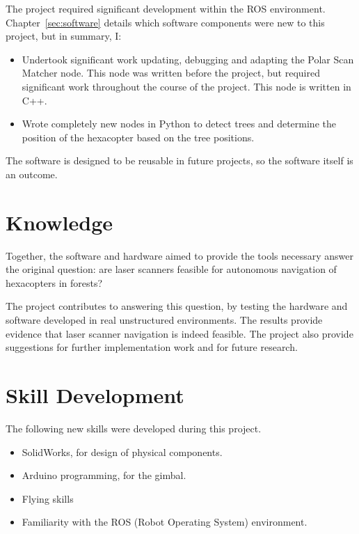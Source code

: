 \documentclass[12pt,oneside,a4paper]{book}
\begin{document}
The project required significant development within the ROS
environment. Chapter~\ref{sec:software} details which software
components were new to this project, but in summary, I:
\begin{itemize}
\item Undertook significant work updating, debugging and adapting the
  Polar Scan Matcher node. This node was written before the project,
  but required significant work throughout the course of the
  project. This node is written in C++.
\item Wrote completely new nodes in Python to detect trees and
  determine the position of the hexacopter based on the tree
  positions.
\end{itemize}

The software is designed to be reusable in future projects, so the
software itself is an outcome.

\section{Knowledge}
\label{sec:knowledge}

Together, the software and hardware aimed to provide the tools
necessary answer the original question: are laser scanners feasible
for autonomous navigation of hexacopters in forests?

The project contributes to answering this question, by testing the
hardware and software developed in real unstructured environments. The
results provide evidence that laser scanner navigation is indeed
feasible. The project also provide suggestions for further
implementation work and for future research.

\section{Skill Development}
\label{sec:skill-development}

The following new skills were developed during this project.

\begin{itemize}
\item SolidWorks, for design of physical components.
\item Arduino programming, for the gimbal.
\item Flying skills
\item Familiarity with the ROS (Robot Operating System) environment.
 \end{itemize}
 
\end{document}
